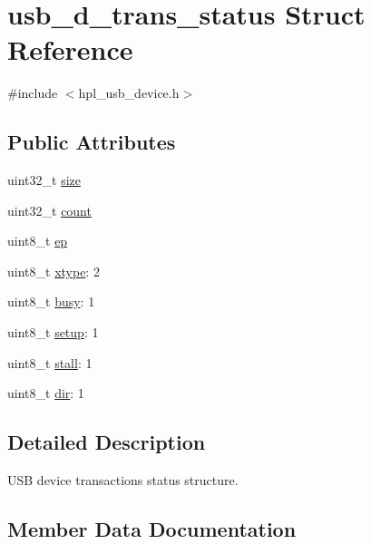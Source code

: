 \hypertarget{structusb__d__trans__status}{}\section{usb\+\_\+d\+\_\+trans\+\_\+status Struct Reference}
\label{structusb__d__trans__status}


{\ttfamily \#include $<$hpl\+\_\+usb\+\_\+device.\+h$>$}

\subsection*{Public Attributes}
\begin{DoxyCompactItemize}
\item 
uint32\+\_\+t \hyperlink{structusb__d__trans__status_ad2e40329b15fb1747b2cccee380838f3}{size}
\item 
uint32\+\_\+t \hyperlink{structusb__d__trans__status_ad340304b84b6d94fb8dd0b9288bd3c05}{count}
\item 
uint8\+\_\+t \hyperlink{structusb__d__trans__status_a97a52984e225a897abf91e01a8cb181e}{ep}
\item 
uint8\+\_\+t \hyperlink{structusb__d__trans__status_a94aa357a9ed58c36355ea18097b22ee2}{xtype}\+: 2
\item 
uint8\+\_\+t \hyperlink{structusb__d__trans__status_ab9b2e28501cc323122cedf06401e0fbb}{busy}\+: 1
\item 
uint8\+\_\+t \hyperlink{structusb__d__trans__status_a0064967b7a44509b6ecdc803562db400}{setup}\+: 1
\item 
uint8\+\_\+t \hyperlink{structusb__d__trans__status_a8895af5fe5956a00b78c420d4d698f11}{stall}\+: 1
\item 
uint8\+\_\+t \hyperlink{structusb__d__trans__status_ab6caafb7304e31f6b1200022eb1568b0}{dir}\+: 1
\end{DoxyCompactItemize}


\subsection{Detailed Description}
U\+SB device transactions status structure. 

\subsection{Member Data Documentation}
\mbox{\label{structusb__d__trans__status_ab9b2e28501cc323122cedf06401e0fbb}} 
